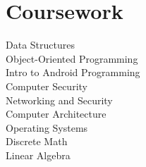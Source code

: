 \documentclass[letterpaper]{deedy-resume} %
\begin{document}
\begin{minipage}[t]{0.33\textwidth}
\section{Coursework}

Data Structures\\
Object-Oriented Programming\\
Intro to Android Programming\\
Computer Security\\
Networking and Security\\
Computer Architecture\\
Operating Systems\\
Discrete Math\\
Linear Algebra




\end{minipage} %
\hfill
%
%
\end{document}
